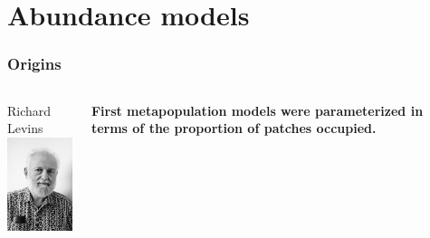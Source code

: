 \documentclass[color=usenames,dvipsnames]{beamer}\usepackage[]{graphicx}\usepackage[]{color}
\begin{document}
\section{Abundance models}



\begin{frame}
  \frametitle{Origins}
  \begin{columns}
    \begin{column}{0.3\textwidth}
      Richard Levins \\
      \includegraphics[width=\textwidth]{figs/levins}
    \end{column}
    \begin{column}{0.7\textwidth}
      {\bf First metapopulation models were parameterized in terms of the
        \alert{proportion of patches occupied}. \par}

\end{column}
\end{columns}
\end{frame}
\end{document}
